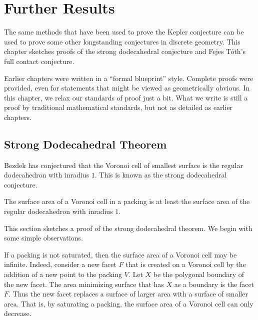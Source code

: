 
\chapter{Further Results}\label{sec:further}


The same methods that have been used to prove the Kepler conjecture
can be used to prove some other longstanding conjectures in discrete
geometry.  This chapter sketches proofs of the strong dodecahedral
conjecture and Fejes T\'oth's full contact conjecture.

Earlier chapters were written in a ``formal blueprint'' style.
Complete proofs were provided, even for statements that might be
viewed as geometrically obvious.  In this chapter, we relax our
standards of proof just a bit.  What we write is still a proof by
traditional mathematical standards, but not as detailed as earlier
chapters.

\section{Strong Dodecahedral Theorem}

Bezdek has conjectured that the Voronoi cell of smallest surface is
the regular dodecahedron with inradius $1$.  This is known as the
strong dodecahedral conjecture.  %
%


\begin{theorem}
  The surface area of a Voronoi cell in a packing is at least the
  surface area of the regular dodecahedron with inradius $1$.
\end{theorem}

This section sketches a proof of the strong dodecahedral theorem.  We
begin with some simple observations.

\begin{remark}
  If a packing is not saturated, then the surface area of a Voronoi
  cell may be infinite.  
  Indeed, consider a new facet $F$ that is created on a Voronoi cell
  by the addition of a new point to the packing $V$.  Let $X$ be the
  polygonal boundary of the new facet.  The area minimizing surface
  that has $X$ as a boundary is the facet $F$.  Thus the new facet
  replaces a surface of larger area with a surface of smaller area.
  That is, by saturating a packing, the surface area of a Voronoi cell
  can only decrease.
\end{remark}


